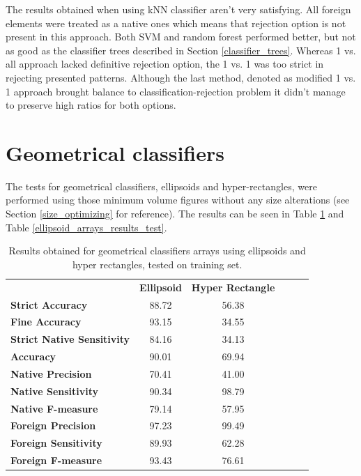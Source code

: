 The results obtained when using kNN classifier aren't very satisfying. All foreign elements were treated as a native ones which means that rejection option is not present in this approach. Both SVM and random forest performed better, but not as good as the classifier trees described in Section \ref{classifier_trees}. Whereas 1 vs. all approach lacked definitive rejection option, the 1 vs. 1 was too strict in rejecting presented patterns. Although the last method, denoted as modified 1 vs. 1 approach brought balance to classification-rejection problem it didn't manage to preserve high ratios for both options.

\section{Geometrical classifiers}

The tests for geometrical classifiers, ellipsoids and hyper-rectangles, were performed using those minimum volume figures without any size alterations (see Section \ref{size_optimizing} for reference). The results can be seen in Table \ref{ellipsoid_arrays_results_training} and Table \ref{ellipsoid_arrays_results_test}.

\begin{table}[htp]
	\centering
	\caption{Results obtained for geometrical classifiers arrays using ellipsoids and hyper rectangles, tested on training set.}
	\label{ellipsoid_arrays_results_training}
	\begin{tabular}{l|c|c|lll}
		\cline{2-3}
		& \multicolumn{1}{l|}{\textbf{Ellipsoid}} & \textbf{Hyper Rectangle}  &  &  \\ \cline{1-3}
		\multicolumn{1}{|l|}{\textbf{Strict Accuracy}}           & 88.72 & 56.38 \\ \cline{1-3}
		\multicolumn{1}{|l|}{\textbf{Fine Accuracy}}             & 93.15 & 34.55 \\ \cline{1-3}
		\multicolumn{1}{|l|}{\textbf{Strict Native Sensitivity}} & 84.16 & 34.13 \\ \cline{1-3}
		\multicolumn{1}{|l|}{\textbf{Accuracy}}                  & 90.01 & 69.94 \\ \cline{1-3}
		\multicolumn{1}{|l|}{\textbf{Native Precision}}          & 70.41 & 41.00 \\ \cline{1-3}
		\multicolumn{1}{|l|}{\textbf{Native Sensitivity}}        & 90.34 & 98.79 \\ \cline{1-3}
		\multicolumn{1}{|l|}{\textbf{Native F-measure}}          & 79.14 & 57.95 \\ \cline{1-3}
		\multicolumn{1}{|l|}{\textbf{Foreign Precision}}         & 97.23 & 99.49 \\ \cline{1-3}
		\multicolumn{1}{|l|}{\textbf{Foreign Sensitivity}}       & 89.93 & 62.28 \\ \cline{1-3}
		\multicolumn{1}{|l|}{\textbf{Foreign F-measure}}         & 93.43 & 76.61 \\ \cline{1-3}
	\end{tabular}
\end{table}

